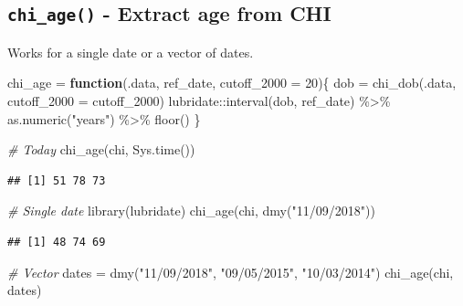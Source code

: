 \documentclass[
]{book}
\newenvironment{Shaded}{\begin{snugshade}}{\end{snugshade}}
\newcommand{\AttributeTok}[1]{\textcolor[rgb]{0.77,0.63,0.00}{#1}}
\newcommand{\CommentTok}[1]{\textcolor[rgb]{0.56,0.35,0.01}{\textit{#1}}}
\newcommand{\ControlFlowTok}[1]{\textcolor[rgb]{0.13,0.29,0.53}{\textbf{#1}}}
\newcommand{\DecValTok}[1]{\textcolor[rgb]{0.00,0.00,0.81}{#1}}
\newcommand{\FunctionTok}[1]{\textcolor[rgb]{0.00,0.00,0.00}{#1}}
\newcommand{\NormalTok}[1]{#1}
\newcommand{\OtherTok}[1]{\textcolor[rgb]{0.56,0.35,0.01}{#1}}
\newcommand{\SpecialCharTok}[1]{\textcolor[rgb]{0.00,0.00,0.00}{#1}}
\newcommand{\StringTok}[1]{\textcolor[rgb]{0.31,0.60,0.02}{#1}}
\begin{document}
\hypertarget{chi_age---extract-age-from-chi}{%
\subsection{\texorpdfstring{\texttt{chi\_age()} - Extract age from CHI}{chi\_age() - Extract age from CHI}}\label{chi_age---extract-age-from-chi}}

Works for a single date or a vector of dates.

\begin{Shaded}
\begin{Highlighting}[]
\NormalTok{chi\_age }\OtherTok{=} \ControlFlowTok{function}\NormalTok{(.data, ref\_date, }\AttributeTok{cutoff\_2000 =} \DecValTok{20}\NormalTok{)\{}
\NormalTok{  dob }\OtherTok{=} \FunctionTok{chi\_dob}\NormalTok{(.data, }\AttributeTok{cutoff\_2000 =}\NormalTok{ cutoff\_2000)}
\NormalTok{  lubridate}\SpecialCharTok{::}\FunctionTok{interval}\NormalTok{(dob, ref\_date) }\SpecialCharTok{\%\textgreater{}\%} 
    \FunctionTok{as.numeric}\NormalTok{(}\StringTok{"years"}\NormalTok{) }\SpecialCharTok{\%\textgreater{}\%} 
    \FunctionTok{floor}\NormalTok{()}
\NormalTok{\}}

\CommentTok{\# Today}
\FunctionTok{chi\_age}\NormalTok{(chi, }\FunctionTok{Sys.time}\NormalTok{())}
\end{Highlighting}
\end{Shaded}

\begin{verbatim}
## [1] 51 78 73
\end{verbatim}

\begin{Shaded}
\begin{Highlighting}[]
\CommentTok{\# Single date}
\FunctionTok{library}\NormalTok{(lubridate)}
\FunctionTok{chi\_age}\NormalTok{(chi, }\FunctionTok{dmy}\NormalTok{(}\StringTok{"11/09/2018"}\NormalTok{))}
\end{Highlighting}
\end{Shaded}

\begin{verbatim}
## [1] 48 74 69
\end{verbatim}

\begin{Shaded}
\begin{Highlighting}[]
\CommentTok{\# Vector}
\NormalTok{dates }\OtherTok{=} \FunctionTok{dmy}\NormalTok{(}\StringTok{"11/09/2018"}\NormalTok{,}
            \StringTok{"09/05/2015"}\NormalTok{,}
            \StringTok{"10/03/2014"}\NormalTok{)}
\FunctionTok{chi\_age}\NormalTok{(chi, dates)}
\end{Highlighting}
\end{Shaded}
\end{document}
